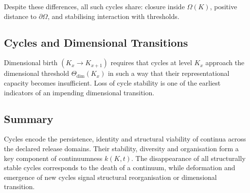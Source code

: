 Despite these differences, all such cycles share:
closure inside \(\Omega(K)\), positive distance to \(\partial\Omega\),
and stabilising interaction with thresholds.

\subsection{Cycles and Dimensional Transitions}

Dimensional birth \((K_x\to K_{x+1})\) requires that cycles at level \(K_x\)
approach the dimensional threshold \(\Theta_{\mathrm{dim}}(K_x)\)
in such a way that their representational capacity becomes insufficient.
Loss of cycle stability is one of the earliest indicators of an impending
dimensional transition.

\subsection{Summary}

Cycles encode the persistence, identity and structural viability
of continua across the declared release domains.
Their stability, diversity and organisation form a key component of
continuumness \(k(K,t)\).
The disappearance of all structurally stable cycles corresponds to
the death of a continuum, while deformation and emergence of new cycles
signal structural reorganisation or dimensional transition.
